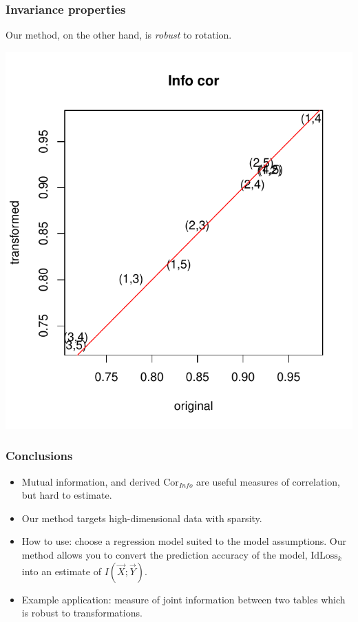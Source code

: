 \documentclass{beamer}
\begin{document}
\begin{frame}
\frametitle{Invariance properties}
Our method, on the other hand, is \emph{robust} to rotation.

\begin{center}
\includegraphics[scale = 0.5]{../idloss/info_cor_robustness.pdf}
\end{center}
\end{frame}

\begin{frame}
\frametitle{Conclusions}
\begin{itemize}
\item Mutual information, and derived $\text{Cor}_{Info}$ are useful measures of correlation, but hard to estimate.\pause
\item Our method targets high-dimensional data with sparsity.\pause
\item How to use: choose a regression model suited to the model
  assumptions.  Our method allows you to convert the prediction
  accuracy of the model, $\text{IdLoss}_k$ into an estimate of $I(\vec{X};
  \vec{Y})$.\pause
\item Example application: measure of joint information between two tables which is robust to transformations.
\end{itemize}
\end{frame}
\end{document}

